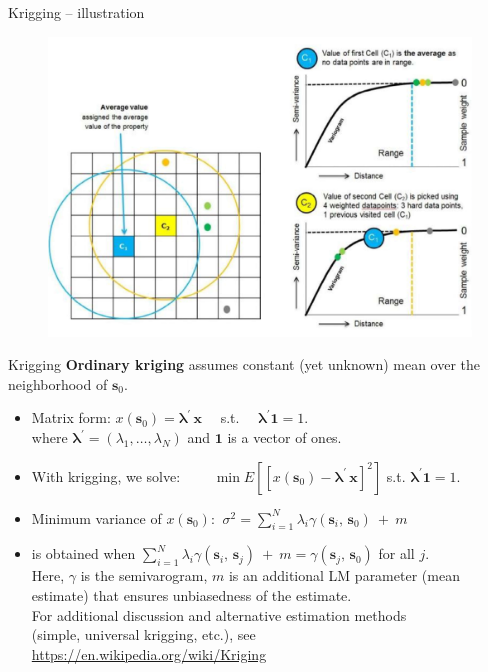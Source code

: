 \documentclass{beamer}
\begin{document}
\begin{frame}{Krigging -- illustration}
\begin{figure}
	\includegraphics[width=.8\textwidth]{IMG/sp_Krigg.pdf}
\end{figure}
\end{frame}
\begin{frame}{Krigging}
\textbf{Ordinary kriging} assumes constant (yet unknown) mean over the neighborhood of $\bm{s}_{0}$. \\ \medskip
\begin{itemize}
    \item Matrix form: $x(\bm{s}_0)= \bm{\lambda}^{\prime} \, \bm{x}$ ~~s.t.~~ $\bm{\lambda}^{\prime} \bm{1} = 1$. \\
    where $\bm{\lambda}^{\prime} = (\lambda_1,\dots,\lambda_N)$ and $\bm{1}$ is a vector of ones.
    \medskip
    \item With krigging, we solve:~~~~ $\min E\left[[x(\bm{s}_0) - \bm{\lambda}^{\prime} \, \bm{x}]^2\right]$ s.t. $\bm{\lambda}^{\prime} \bm{1} = 1$.\\
    \medskip
    \item  Minimum variance of $x(\bm{s}_0)$: $~\sigma^2= \sum_{i=1}^N \lambda_i \gamma (\bm{s}_i,\,\bm{s}_0)~+~m \,$
    \medskip
    \item is obtained when $\sum_{i=1}^N \lambda_i \gamma (\bm{s}_i,\,\bm{s}_j)~+~m = \gamma (\bm{s}_j,\,\bm{s}_0)$ for all $j$. \\
    \medskip
    Here, $\gamma$ is the semivarogram, $m$ is an additional LM parameter (mean estimate) that ensures unbiasedness of the estimate. \\For additional discussion and alternative estimation methods \\(simple, universal krigging, etc.), see\\
    \url{https://en.wikipedia.org/wiki/Kriging}
\end{itemize}
\end{frame}
\end{document}

